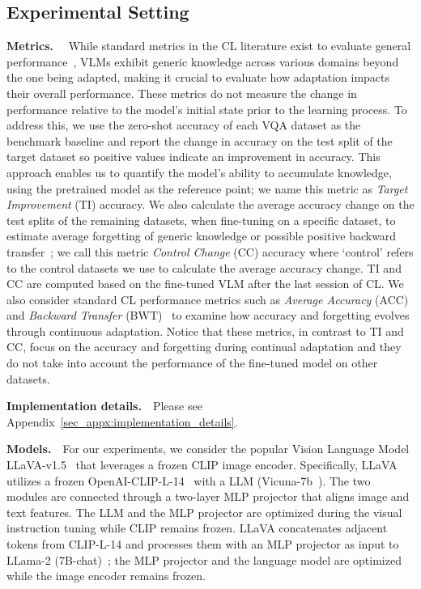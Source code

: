 

\subsection{Experimental Setting}\label{sec:experimental_settings}

\textbf{Metrics.}~~%
While standard metrics in the CL literature exist to evaluate general performance~\cite{lopez2017gradient,chaudhry2018riemannian}, VLMs exhibit generic knowledge across various domains beyond the one being adapted, making it crucial to evaluate how adaptation impacts their overall performance. These metrics do not measure the change in performance relative to the model's initial state prior to the learning process.
To address this, we use the zero-shot accuracy of each VQA dataset as the benchmark baseline and report the change in accuracy on the test split of the target dataset so positive values indicate an improvement in accuracy. This approach enables us to quantify the model's ability to accumulate knowledge, using the pretrained model as the reference point; we name this metric as \emph{Target Improvement} (TI) accuracy. We also calculate the average accuracy change on the test splits of the remaining datasets, when fine-tuning on a specific dataset, to estimate average forgetting of generic knowledge or possible positive backward transfer~\cite{de2021continual}; we call this metric \emph{Control Change} (CC) accuracy where `control' refers to the control datasets we use to calculate the average accuracy change. TI and CC are computed based on the fine-tuned VLM after the last session of CL. We also consider standard CL performance metrics such as \emph{Average Accuracy} (ACC) and \emph{Backward Transfer} (BWT)~\cite{lopez2017gradient} to examine how accuracy and forgetting evolves through continuous adaptation. Notice that these metrics, in contrast to TI and CC, focus on the accuracy and forgetting during continual adaptation and they do not take into account the performance of the fine-tuned model on other datasets.

\textbf{Implementation details.}~~Please see Appendix~\ref{sec_appx:implementation_details}.


\textbf{Models.}~~For our experiments, we consider the popular Vision Language Model LLaVA-v1.5~\cite{liu2024visual} that leverages a frozen CLIP image encoder. Specifically, LLaVA utilizes a frozen OpenAI-CLIP-L-14~\cite{radford2021learning} with a LLM (Vicuna-7b~\cite{chiang2023vicuna}). The two modules are connected through a two-layer MLP projector that aligns image and text features. The LLM and the MLP projector are optimized during the visual instruction tuning while CLIP remains frozen. LLaVA concatenates adjacent tokens from CLIP-L-14 and processes them with an MLP projector as input to LLama-2 (7B-chat)~\cite{touvron2023llama}; the MLP projector and the language model are optimized while the image encoder remains frozen. 

